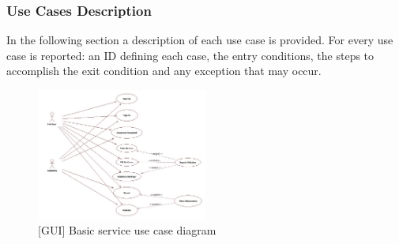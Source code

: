 


\subsubsection{Use Cases Description}
In the following section a description of each use case is provided. For every use case is reported: an ID defining each case, the entry conditions, the steps to accomplish the exit condition and any exception that may occur. \\



 \begin{figure}[H]
		\centering
      \includegraphics[width=0.5\textwidth]{GUI/BasicServiceUseCase.jpg}
      \caption{[GUI] Basic service use case diagram}   \label{fig:BasicService}
\end{figure}

